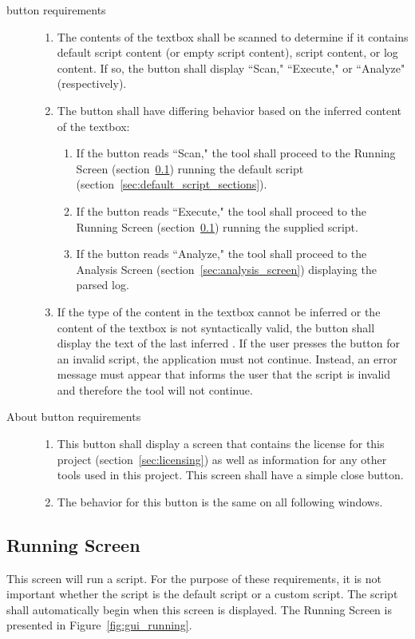 \begin{description}
\item[ button requirements] \hfill
\begin{enumerate}
\item The contents of the textbox shall be scanned to determine if it contains
default script content (or empty script content), script content, or log
content.  If so, the button shall display ``Scan," ``Execute," or ``Analyze"
(respectively).
\item The button shall have differing behavior based on the inferred content of
the textbox:
\begin{enumerate}
\item If the button reads ``Scan," the tool shall proceed to the Running Screen
(section~\ref{sec:running_screen}) running the default script
(section~\ref{sec:default_script_sections}).
\item If the button reads ``Execute," the tool shall proceed to the Running
Screen (section~\ref{sec:running_screen}) running the supplied script.
\item If the button reads ``Analyze," the tool shall proceed to the Analysis
Screen (section~\ref{sec:analysis_screen}) displaying the parsed log.
\end{enumerate}
\item If the type of the content in the textbox cannot be inferred or the
content of the textbox is not syntactically valid, the button shall display
the text of the last inferred .  If the user presses the
 button for an invalid script, the application must not continue. 
Instead, an error message must appear that informs the user that the script is
invalid and therefore the tool will not continue.
\end{enumerate}

\item[About button requirements] \hfill
\begin{enumerate}
\item This button shall display a screen that contains the license for this
project (section~\ref{sec:licensing}) as well as information for any other
tools used in this project.  This screen shall have a simple close button.
\item The behavior for this button is the same on all following windows. 
\end{enumerate}
\end{description}

\subsection{Running Screen} \label{sec:running_screen}
This screen will run a script.  For the purpose of these requirements, it is not
important whether the script is the default script or a custom script.  The
script shall automatically begin when this screen is displayed.  The Running 
Screen is presented in Figure~\ref{fig:gui_running}.

